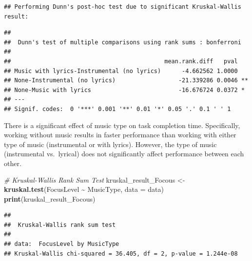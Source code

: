 \documentclass[
]{article}
\newenvironment{Shaded}{\begin{snugshade}}{\end{snugshade}}
\newcommand{\AttributeTok}[1]{\textcolor[rgb]{0.13,0.29,0.53}{#1}}
\newcommand{\CommentTok}[1]{\textcolor[rgb]{0.56,0.35,0.01}{\textit{#1}}}
\newcommand{\ControlFlowTok}[1]{\textcolor[rgb]{0.13,0.29,0.53}{\textbf{#1}}}
\newcommand{\FloatTok}[1]{\textcolor[rgb]{0.00,0.00,0.81}{#1}}
\newcommand{\FunctionTok}[1]{\textcolor[rgb]{0.13,0.29,0.53}{\textbf{#1}}}
\newcommand{\NormalTok}[1]{#1}
\newcommand{\OtherTok}[1]{\textcolor[rgb]{0.56,0.35,0.01}{#1}}
\newcommand{\SpecialCharTok}[1]{\textcolor[rgb]{0.81,0.36,0.00}{\textbf{#1}}}
\newcommand{\StringTok}[1]{\textcolor[rgb]{0.31,0.60,0.02}{#1}}
\begin{document}
\begin{verbatim}
## Performing Dunn's post-hoc test due to significant Kruskal-Wallis result:
\end{verbatim}

\begin{verbatim}
## 
##  Dunn's test of multiple comparisons using rank sums : bonferroni  
## 
##                                            mean.rank.diff   pval    
## Music with lyrics-Instrumental (no lyrics)      -4.662562 1.0000    
## None-Instrumental (no lyrics)                  -21.339286 0.0046 ** 
## None-Music with lyrics                         -16.676724 0.0372 *  
## ---
## Signif. codes:  0 '***' 0.001 '**' 0.01 '*' 0.05 '.' 0.1 ' ' 1
\end{verbatim}

There is a significant effect of music type on task completion time.
Specifically, working without music results in faster performance than
working with either type of music (instrumental or with lyrics).
However, the type of music (instrumental vs.~lyrical) does not
significantly affect performance between each other.

\begin{Shaded}
\begin{Highlighting}[]
\CommentTok{\# Kruskal{-}Wallis Rank Sum Test}
\NormalTok{kruskal\_result\_Focous }\OtherTok{\textless{}{-}} \FunctionTok{kruskal.test}\NormalTok{(FocusLevel }\SpecialCharTok{\textasciitilde{}}\NormalTok{ MusicType, }\AttributeTok{data =}\NormalTok{ data)}
\FunctionTok{print}\NormalTok{(kruskal\_result\_Focous)}
\end{Highlighting}
\end{Shaded}

\begin{verbatim}
## 
##  Kruskal-Wallis rank sum test
## 
## data:  FocusLevel by MusicType
## Kruskal-Wallis chi-squared = 36.405, df = 2, p-value = 1.244e-08
\end{verbatim}

\begin{Shaded}
\end{Shaded}
\end{document}
